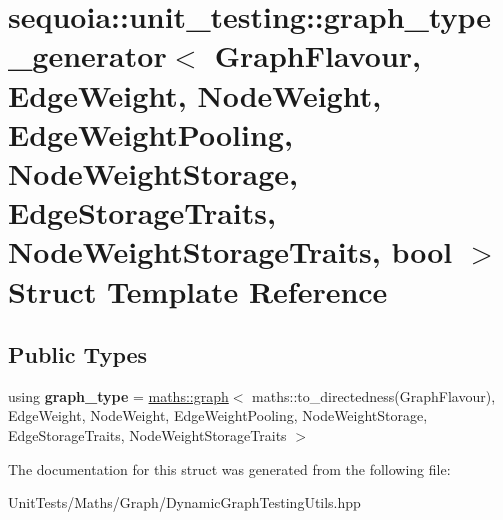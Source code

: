 \hypertarget{structsequoia_1_1unit__testing_1_1graph__type__generator}{}\section{sequoia\+::unit\+\_\+testing\+::graph\+\_\+type\+\_\+generator$<$ Graph\+Flavour, Edge\+Weight, Node\+Weight, Edge\+Weight\+Pooling, Node\+Weight\+Storage, Edge\+Storage\+Traits, Node\+Weight\+Storage\+Traits, bool $>$ Struct Template Reference}
\label{structsequoia_1_1unit__testing_1_1graph__type__generator}
\subsection*{Public Types}
\begin{DoxyCompactItemize}
\item 
\mbox{\label{structsequoia_1_1unit__testing_1_1graph__type__generator_a425579523be97196c8e1edbe4b0e255d}} 
using {\bfseries graph\+\_\+type} = \mbox{\hyperlink{classsequoia_1_1maths_1_1graph}{maths\+::graph}}$<$ maths\+::to\+\_\+directedness(Graph\+Flavour), Edge\+Weight, Node\+Weight, Edge\+Weight\+Pooling, Node\+Weight\+Storage, Edge\+Storage\+Traits, Node\+Weight\+Storage\+Traits $>$
\end{DoxyCompactItemize}


The documentation for this struct was generated from the following file\+:\begin{DoxyCompactItemize}
\item 
Unit\+Tests/\+Maths/\+Graph/Dynamic\+Graph\+Testing\+Utils.\+hpp\end{DoxyCompactItemize}
